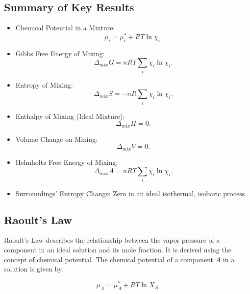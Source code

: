 \documentclass{article}
\theoremstyle{definition}
\begin{document}
\subsection{Summary of Key Results}
\begin{itemize}
    \item Chemical Potential in a Mixture:
    \begin{equation}
    \mu_i = \mu_i^* + RT\ln{\chi_i}.
    \end{equation}
    \item Gibbs Free Energy of Mixing:
    \begin{equation}
    \Delta_{mix} G = nRT\sum_i \chi_i\ln{\chi_i}.
    \end{equation}
    \item Entropy of Mixing:
    \begin{equation}
    \Delta_{mix} S = -nR\sum_i \chi_i\ln{\chi_i}.
    \end{equation}
    \item Enthalpy of Mixing (Ideal Mixture):
    \begin{equation}
    \Delta_{mix} H = 0.
    \end{equation}
    \item Volume Change on Mixing:
    \begin{equation}
    \Delta_{mix} V = 0.
    \end{equation}
    \item Helmholtz Free Energy of Mixing:
    \begin{equation}
    \Delta_{mix} A = nRT\sum_i \chi_i\ln{\chi_i}.
    \end{equation}
    \item Surroundings’ Entropy Change: Zero in an ideal isothermal, isobaric process.
\end{itemize}



\subsection{Raoult's Law}

Raoult's Law describes the relationship between the vapor pressure of a component in an ideal solution and its mole fraction. It is derived using the concept of chemical potential. The chemical potential of a component $A$ in a solution is given by:

\begin{equation}
\mu_A = \mu_A^* + RT \ln X_A
\end{equation}
\end{document}

